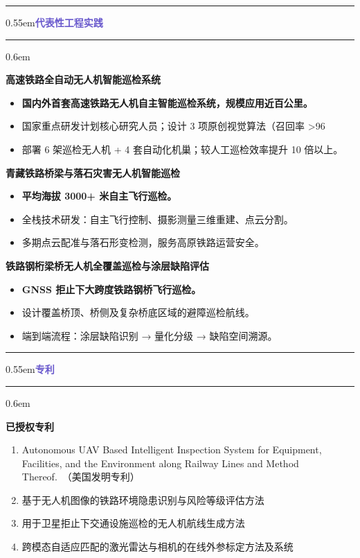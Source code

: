 \documentclass[10.5pt,a4paper]{ctexart}
\newcommand{\secbar}{\textcolor{hairdk}{\rule[0.35ex]{0.12em}{1.35em}}}
\newcommand{\cvsec}[1]{{%
  \par\noindent\nopagebreak\medskip
  \secbar\kern0.55em\textcolor{slateblue}{\sffamily\bfseries\large #1}\par\nopagebreak
  \noindent\textcolor{hair}{\rule[0.2em]{\textwidth}{0.55pt}}\par\nopagebreak
  \kern0.6em
}}
\begin{document}
\cvsec{代表性工程实践}

\noindent\textbf{高速铁路全自动无人机智能巡检系统}\par
\vspace{0.2em}
\begin{itemize}[leftmargin=0.85em,itemsep=2.5pt,label=\textcolor{muted}{$\cdot$}]
  \item \textbf{国内外首套高速铁路无人机自主智能巡检系统，规模应用近百公里。}
  \item 国家重点研发计划核心研究人员；设计 3 项原创视觉算法（召回率 >96%
  \item 部署 6 架巡检无人机 + 4 套自动化机巢；较人工巡检效率提升 10 倍以上。
\end{itemize}

\vspace{0.5em}\noindent\textbf{青藏铁路桥梁与落石灾害无人机智能巡检}\par
\vspace{0.2em}
\begin{itemize}[leftmargin=0.85em,itemsep=2.5pt,label=\textcolor{muted}{$\cdot$}]
  \item \textbf{平均海拔 3000+ 米自主飞行巡检。}
  \item 全栈技术研发：自主飞行控制、摄影测量三维重建、点云分割。
  \item 多期点云配准与落石形变检测，服务高原铁路运营安全。
\end{itemize}

\vspace{0.5em}\noindent\textbf{铁路钢桁梁桥无人机全覆盖巡检与涂层缺陷评估}\par
\vspace{0.2em}
\begin{itemize}[leftmargin=0.85em,itemsep=2.5pt,label=\textcolor{muted}{$\cdot$}]
  \item \textbf{GNSS 拒止下大跨度铁路钢桥飞行巡检。}
  \item 设计覆盖桥顶、桥侧及复杂桥底区域的避障巡检航线。
  \item 端到端流程：涂层缺陷识别 → 量化分级 → 缺陷空间溯源。
\end{itemize}

\cvsec{专利}

\noindent\textbf{已授权专利}\par
\vspace{0.2em}
\begin{enumerate}[leftmargin=1.7em,itemsep=2pt,labelsep=0.5em]
  \item Autonomous UAV Based Intelligent Inspection System for Equipment, Facilities, and the Environment along Railway Lines and Method Thereof.\ {\scriptsize\color{muted}（美国发明专利）}
  \item 基于无人机图像的铁路环境隐患识别与风险等级评估方法
  \item 用于卫星拒止下交通设施巡检的无人机航线生成方法
  \item 跨模态自适应匹配的激光雷达与相机的在线外参标定方法及系统
\end{enumerate}
\end{document}

